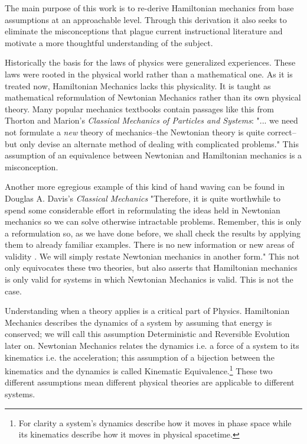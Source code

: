 \documentclass{article}[a4paper]
\begin{document}
	The main purpose of this work is to re-derive Hamiltonian mechanics from base assumptions at an approachable level. Through this derivation it also seeks to eliminate the misconceptions that plague current instructional literature and motivate a more thoughtful understanding of the subject.
	
	 Historically the basis for the laws of physics were generalized experiences. These laws were rooted in the physical world rather than a mathematical one. As it is treated now, Hamiltonian Mechanics lacks this physicality. It is taught as mathematical reformulation of Newtonian Mechanics rather than its own physical theory. Many popular mechanics textbooks contain passages like this from Thorton and Marion's \textit{Classical Mechanics of Particles and Systems}: "... we need not formulate a \textit{new} theory of mechanics--the Newtonian theory is quite correct--but only devise an alternate method of dealing with complicated problems.\cite{thornton_marion_2014}" This assumption of an equivalence between Newtonian and Hamiltonian mechanics is a misconception.
	
	Another more egregious example of this kind of hand waving can be found in Douglas A. Davis's \textit{Classical Mechanics} "Therefore, it is quite worthwhile to spend some considerable effort in reformulating the ideas held in Newtonian mechanics so we can solve otherwise intractable problems. Remember, this is only a reformulation so, as we have done before, we shall check the results by applying them to already familiar examples. There is no new information or new areas of validity . We will simply restate Newtonian mechanics in another form.\cite{davis_2012}" This not only equivocates these two theories, but also asserts that Hamiltonian mechanics is only valid for systems in which Newtonian Mechanics is valid. This is not the case.
	
	Understanding when a theory applies is a critical part of Physics. Hamiltonian Mechanics describes the dynamics of a system by assuming that energy is conserved; we will call this assumption Deterministic and Reversible Evolution later on. Newtonian Mechanics relates the dynamics i.e. a force of a system to its kinematics i.e. the acceleration; this assumption of a bijection between the kinematics and the dynamics is called Kinematic Equivalence.\footnote{For clarity a system's dynamics describe how it moves in phase space while its kinematics describe how it moves in physical spacetime.} These two different assumptions mean different physical theories are applicable to different systems.
	
\end{document}
